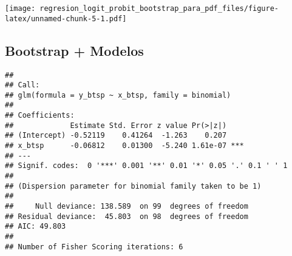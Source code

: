 \documentclass[
]{article}
\newenvironment{Shaded}{\begin{snugshade}}{\end{snugshade}}
\newcommand{\AttributeTok}[1]{\textcolor[rgb]{0.13,0.29,0.53}{#1}}
\newcommand{\ConstantTok}[1]{\textcolor[rgb]{0.56,0.35,0.01}{#1}}
\newcommand{\DecValTok}[1]{\textcolor[rgb]{0.00,0.00,0.81}{#1}}
\newcommand{\FunctionTok}[1]{\textcolor[rgb]{0.13,0.29,0.53}{\textbf{#1}}}
\newcommand{\NormalTok}[1]{#1}
\newcommand{\OtherTok}[1]{\textcolor[rgb]{0.56,0.35,0.01}{#1}}
\newcommand{\SpecialCharTok}[1]{\textcolor[rgb]{0.81,0.36,0.00}{\textbf{#1}}}
\begin{document}
\texttt{[image: regresion\_logit\_probit\_bootstrap\_para\_pdf\_files/figure-latex/unnamed-chunk-5-1.pdf]}

\subsection{Bootstrap + Modelos}\label{bootstrap-modelos}

\begin{Shaded}
\end{Shaded}

\begin{verbatim}
## 
## Call:
## glm(formula = y_btsp ~ x_btsp, family = binomial)
## 
## Coefficients:
##             Estimate Std. Error z value Pr(>|z|)    
## (Intercept) -0.52119    0.41264  -1.263    0.207    
## x_btsp      -0.06812    0.01300  -5.240 1.61e-07 ***
## ---
## Signif. codes:  0 '***' 0.001 '**' 0.01 '*' 0.05 '.' 0.1 ' ' 1
## 
## (Dispersion parameter for binomial family taken to be 1)
## 
##     Null deviance: 138.589  on 99  degrees of freedom
## Residual deviance:  45.803  on 98  degrees of freedom
## AIC: 49.803
## 
## Number of Fisher Scoring iterations: 6
\end{verbatim}
\end{document}
